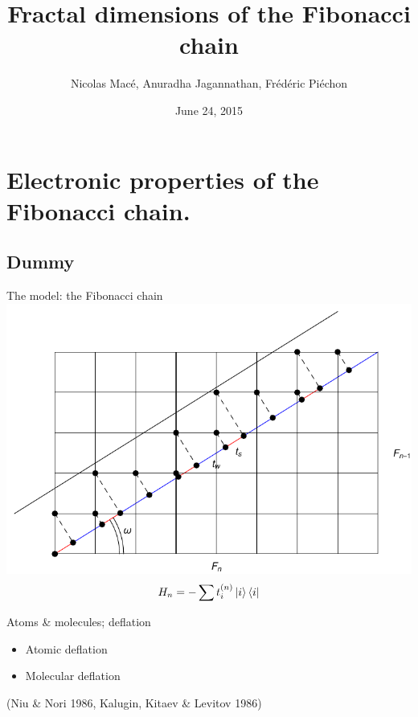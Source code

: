 \documentclass[xcolor=x11names,compress,professionalfonts]{beamer}
\renewcommand{\(}{\begin{columns}}
\renewcommand{\)}{\end{columns}}
\newcommand{\<}[1]{\begin{column}{#1}}
\renewcommand{\>}{\end{column}}
\newcommand{\ham}{\ensuremath{H}}
\begin{document}
\begin{frame}
\title{Fractal dimensions of the Fibonacci chain}
\author{ Nicolas Macé, Anuradha Jagannathan, Frédéric Piéchon }
\date{
	June 24, 2015
}
\titlepage
\end{frame}

\section{Electronic properties of the Fibonacci chain.}
\subsection{Dummy}

\begin{frame}{The model: the Fibonacci chain}
	\centering
	\includegraphics[scale=.7]{cut_and_project.pdf}
	\[ \ham_n = - \sum t_i^{(n)} \ket{i} \bra{i} \]
\end{frame}

\begin{frame}{Atoms \& molecules; deflation}
	\centering
	\begin{itemize}
	\item Atomic deflation 
	\item Molecular deflation 
	\end{itemize}
	\begin{flushright}
	(Niu \& Nori 1986, Kalugin, Kitaev \& Levitov 1986)
	\end{flushright}
\end{frame}
\end{document}
